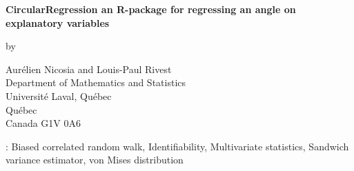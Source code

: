 \thispagestyle{empty}
\begin{center} {\bf {CircularRegression an R-package for regressing an angle on explanatory variables}} \vspace{5mm}


by

Aur\'{e}lien Nicosia and Louis-Paul Rivest \\ Department of Mathematics and Statistics\\ Universit\'e
Laval, Qu\'ebec\\  Qu\'ebec \\ Canada G1V 0A6\\

\vspace{.5cm}



\end{center}

\setlength{\baselineskip}{4ex}

\vspace{0.75cm}


:   Biased correlated random walk,  Identifiability, Multivariate statistics, Sandwich variance estimator, von Mises distribution




